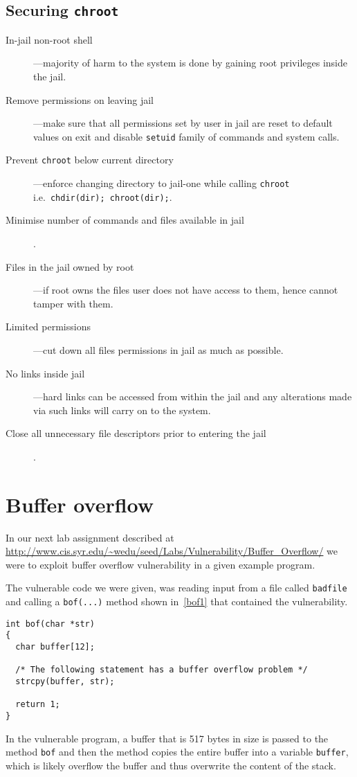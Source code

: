 \documentclass[12pt, a4paper, pdflatex]{article}
\begin{document}
\subsection{Securing \texttt{chroot}}
\begin{description}
  \item[In-jail non-root shell]---majority of harm to the system is done by gaining root privileges inside the jail.
  \item[Remove permissions on leaving jail]---make sure that all permissions set by user in jail are reset to default values on exit and disable \texttt{setuid} family of commands and system calls.
  \item[Prevent \texttt{chroot} below current directory]---enforce changing directory to jail-one while calling \texttt{chroot} i.e.\ \texttt{chdir(dir); chroot(dir);}.
  \item[Minimise number of commands and files available in jail].
  \item[Files in the jail owned by root]---if root owns the files user does not have access to them, hence cannot tamper with them.
  \item[Limited permissions]---cut down all files permissions in jail as much as possible.
  \item[No links inside jail]---hard links can be accessed from within the jail and any alterations made via such links will carry on to the system.
  \item[Close all unnecessary file descriptors prior to entering the jail].
\end{description}

\section{Buffer overflow\label{sec:buffover}}

In our next lab assignment described at \url{http://www.cis.syr.edu/~wedu/seed/Labs/Vulnerability/Buffer_Overflow/} we were to exploit buffer overflow vulnerability in a given example program.

The vulnerable code we were given, was reading input from a file called \texttt{badfile} and calling a \texttt{bof(...)} method shown in~\ref{bof1} that contained the vulnerability.

\vspace{1em}
\lstset{
	captionpos=b,
	frame=single,
	language=C,
	breaklines=true,
	caption=Function with buffer overflow vulnerability,
	label=bof1,
}
\begin{lstlisting}
int bof(char *str)
{
  char buffer[12];

  /* The following statement has a buffer overflow problem */ 
  strcpy(buffer, str);

  return 1;
}
\end{lstlisting}
In the vulnerable program, a buffer that is 517 bytes in size is passed to the method \texttt{bof} and then the method copies the entire buffer into a variable \texttt{buffer}, which is likely overflow the buffer and thus overwrite the content of the stack.
\end{document}
